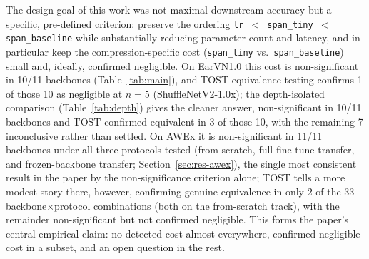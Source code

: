 \documentclass[11pt]{article}
\begin{document}
The design goal of this work was not maximal downstream accuracy but a specific, pre-defined criterion: preserve the ordering \texttt{lr $<$ span\_tiny $<$ span\_baseline} while substantially reducing parameter count and latency, and in particular keep the compression-specific cost (\texttt{span\_tiny} vs.\ \texttt{span\_baseline}) small and, ideally, confirmed negligible. On EarVN1.0 this cost is non-significant in 10/11 backbones (Table~\ref{tab:main}), and TOST equivalence testing confirms 1 of those 10 as negligible at $n=5$ (ShuffleNetV2-1.0x); the depth-isolated comparison (Table~\ref{tab:depth}) gives the cleaner answer, non-significant in 10/11 backbones and TOST-confirmed equivalent in 3 of those 10, with the remaining 7 inconclusive rather than settled. On AWEx it is non-significant in 11/11 backbones under all three protocols tested (from-scratch, full-fine-tune transfer, and frozen-backbone transfer; Section~\ref{sec:res-awex}), the single most consistent result in the paper by the non-significance criterion alone; TOST tells a more modest story there, however, confirming genuine equivalence in only 2 of the 33 backbone$\times$protocol combinations (both on the from-scratch track), with the remainder non-significant but not confirmed negligible. This forms the paper's central empirical claim: no detected cost almost everywhere, confirmed negligible cost in a subset, and an open question in the rest.
\end{document}

